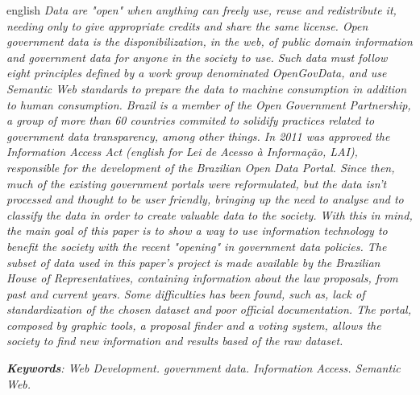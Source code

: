 \documentclass[
	12pt,				%
	openright,			%
	twoside,			%
	a4paper,			%
	english,			%
	french,				%
	spanish,			%
	brazil				%
	]{abntex2}
\begin{document}
\begin{resumo}[Abstract]
 \begin{otherlanguage*}{english}
\emph{ Data are "open" when anything can freely use, reuse and
redistribute it, needing only to give appropriate credits 
and share the same license.
Open government data is the disponibilization, in the web,
of public domain information and government data for anyone
in the society to use.
Such data must follow eight principles defined by a work group
denominated OpenGovData, and use Semantic Web standards to
prepare the data to machine consumption in addition to human consumption.
Brazil is a member of the Open Government Partnership, a group
of more than 60 countries commited to solidify practices related
to government data transparency, among other things.
In 2011 was approved the Information Access Act (english for Lei
de Acesso à Informação, LAI), responsible for the development of
the Brazilian Open Data Portal.
Since then, much of the existing government portals were reformulated,
but the data isn't processed and thought to be user friendly, bringing
up the need to analyse and to classify the data in order to create
valuable data to the society.
With this in mind, the main goal of this paper is to show a way
to use information technology to benefit the society with the
recent "opening" in government data policies.
The subset of data used in this paper's project is made available
by the Brazilian House of Representatives, containing information
about the law proposals, from past and current years.
Some difficulties has been found, such as, lack of standardization
of the chosen dataset and poor official documentation.
The portal, composed by graphic tools, a proposal finder and a voting system,
allows the society to find new information and results based of the raw
dataset.}
   \vspace{\onelineskip}
 
   \noindent 
   \emph{ \textbf {Keywords}: Web Development. government data. Information Access. Semantic Web.} 
 \end{otherlanguage*}
\end{resumo}


\listoffigures*
\cleardoublepage

\listoftables*
\cleardoublepage
\end{document}
